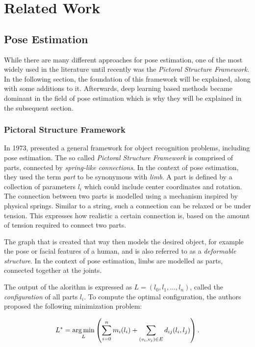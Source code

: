 \chapter{Related Work}

\section{Pose Estimation}

While there are many different approaches for pose estimation, one of the most widely used in the literature until recently was the \textit{Pictoral Structure Framework}.
In the following section, the foundation of this framework will be explained, along with some additions to it.
Afterwards, deep learning based methods became dominant in the field of pose estimation which is why they will be explained in the subsequent section.

\subsection{Pictoral Structure Framework}
In 1973, \cite{fischler_representation_1973} presented a general framework for object recognition problems, including pose estimation.
The so called \textit{Pictoral Structure Framework} is comprised of parts, connected by \textit{spring-like connections}.
In the context of pose estimation, they used the term \textit{part} to be synonymous with \textit{limb}.
A part is defined by a collection of parameters $l_i$ which could include center coordinates and rotation.
The connection between two parts is modelled using a mechanism inspired by physical springs.
Similar to a string, such a connection can be relaxed or be under tension.
This expresses how realistic a certain connection is, based on the amount of tension required to connect two parts.

The graph that is created that way then models the desired object, for example the pose or facial features of a human, and is also referred to as a \textit{deformable structure}.
In the context of pose estimation, limbs are modelled as parts, connected together at the joints.

The output of the alorithm is expressed as $L = (l_0, l_1, \dots, l_n)$, called the \textit{configuration} of all parts $l_i$.
To compute the optimal configuration, the authors proposed the following minimization problem:

\begin{equation}
    \label{eq:energy-minimization}
    L^* = \operatorname*{arg\,min}_L \left(\sum_{i=0}^n m_i(l_i) + \sum_{(v_i, v_j) \in E} d_{ij}(l_i, l_j)\right).
\end{equation}

